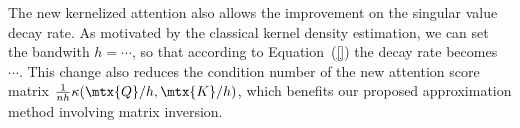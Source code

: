The new kernelized attention also allows the improvement on the singular value decay rate.
As motivated by the classical kernel density estimation, we can set the bandwith $h = \cdots$, 
so that according to Equation~(\ref{}) the decay rate becomes $\cdots$.
This change also reduces the condition number of the new attention score matrix $\frac{1}{nh} \kappa(\mtx{Q} / h, \mtx{K} / h)$,
which benefits our proposed approximation method involving matrix inversion.


\fi